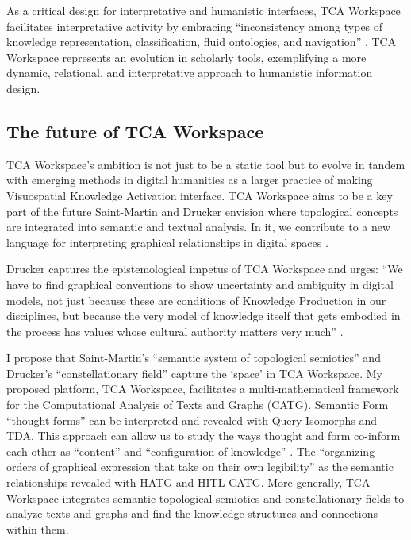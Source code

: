 As a critical design for interpretative and humanistic interfaces, TCA Workspace facilitates interpretative activity by embracing “inconsistency among types of knowledge representation, classification, fluid ontologies, and navigation” \citep[p. 178]{drucker_graphesis_2014}. TCA Workspace represents an evolution in scholarly tools, exemplifying a more dynamic, relational, and interpretative approach to humanistic information design.


\subsection{The future of TCA Workspace}

TCA Workspace’s ambition is not just to be a static tool but to evolve in tandem with emerging methods in digital humanities as a larger practice of making Visuospatial Knowledge Activation interface. TCA Workspace aims to be a key part of the future Saint-Martin and Drucker envision where topological concepts are integrated into semantic and textual analysis. In it, we contribute to a new language for interpreting graphical relationships in digital spaces \citep[p. 225]{saint-martin_semiotics_1990} \citep[p. 54]{drucker_graphesis_2014}.
 

Drucker captures the epistemological impetus of TCA Workspace and urges: “We have to find graphical conventions to show uncertainty and ambiguity in digital models, not just because these are conditions of Knowledge Production in our disciplines, but because the very model of knowledge itself that gets embodied in the process has values whose cultural authority matters very much” \citep[p. 190-191]{drucker_graphesis_2014}. 

I propose that Saint-Martin’s “semantic system of topological semiotics” \citep[p. 225]{saint-martin_semiotics_1990} and Drucker’s “constellationary field” \citep[p. 196]{drucker_graphesis_2014} capture the ‘space’ in TCA Workspace. My proposed platform, TCA Workspace, facilitates a multi-mathematical framework for the Computational Analysis of Texts and Graphs (CATG). Semantic Form “thought forms” \citep[p. 196]{drucker_graphesis_2014} can be interpreted and revealed with Query Isomorphs and TDA. This approach can allow us to study the ways thought and form co-inform each other as “content” and “configuration of knowledge” \citep[p. 196]{drucker_graphesis_2014}. The “organizing orders of graphical expression that take on their own legibility” \citep[p. 196]{drucker_graphesis_2014} as the semantic relationships revealed with HATG and HITL CATG. More generally, TCA Workspace integrates semantic topological semiotics and constellationary fields to analyze texts and graphs and find the knowledge structures and connections within them.


